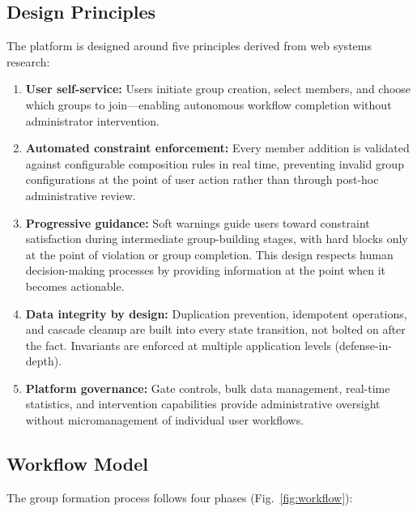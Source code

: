 \documentclass[11pt,a4paper]{article}
\theoremstyle{plain}
\theoremstyle{definition}
\begin{document}
\subsection{Design Principles}

The platform is designed around five principles derived from web systems research:

\begin{enumerate}[noitemsep,topsep=4pt]
    \item \textbf{User self-service:} Users initiate group creation, select members, and choose which groups to join---enabling autonomous workflow completion without administrator intervention.
    \item \textbf{Automated constraint enforcement:} Every member addition is validated against configurable composition rules in real time, preventing invalid group configurations at the point of user action rather than through post-hoc administrative review.
    \item \textbf{Progressive guidance:} Soft warnings guide users toward constraint satisfaction during intermediate group-building stages, with hard blocks only at the point of violation or group completion. This design respects human decision-making processes by providing information at the point when it becomes actionable.
    \item \textbf{Data integrity by design:} Duplication prevention, idempotent operations, and cascade cleanup are built into every state transition, not bolted on after the fact. Invariants are enforced at multiple application levels (defense-in-depth).
    \item \textbf{Platform governance:} Gate controls, bulk data management, real-time statistics, and intervention capabilities provide administrative oversight without micromanagement of individual user workflows.
\end{enumerate}

\subsection{Workflow Model}

The group formation process follows four phases (Fig.~\ref{fig:workflow}):
\end{document}
